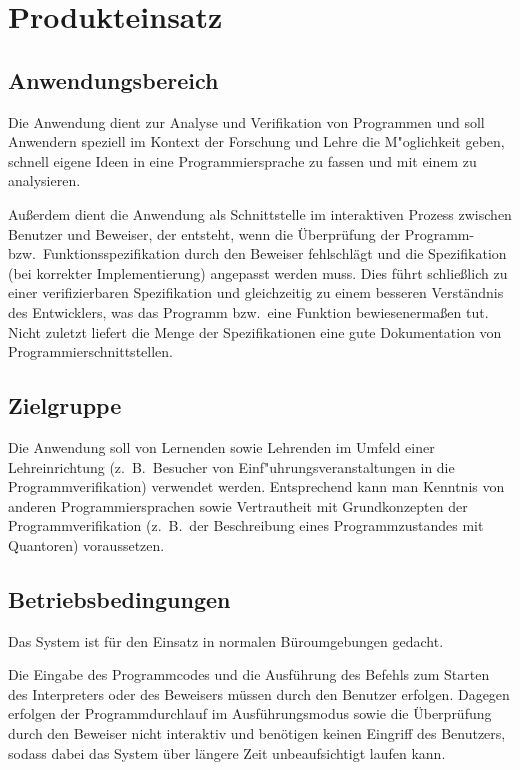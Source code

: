 \section{Produkteinsatz}%

\subsection{Anwendungsbereich}%

Die Anwendung dient zur Analyse und Verifikation von Programmen und soll Anwendern speziell im Kontext der Forschung und Lehre die M"oglichkeit geben, schnell eigene Ideen in eine Programmiersprache zu fassen und mit einem  zu analysieren.%

Außerdem dient die Anwendung als Schnittstelle im interaktiven Prozess zwischen Benutzer und Beweiser, der entsteht, wenn die Überprüfung der Programm- bzw.\ Funktionsspezifikation durch den Beweiser fehlschlägt und die Spezifikation (bei korrekter Implementierung) angepasst werden muss. Dies führt schließlich zu einer verifizierbaren Spezifikation und gleichzeitig zu einem besseren Verständnis des Entwicklers, was das Programm bzw.\ eine Funktion bewiesenermaßen tut. Nicht zuletzt liefert die Menge der Spezifikationen eine gute Dokumentation von Programmierschnittstellen.%

\subsection{Zielgruppe}%

Die Anwendung soll von Lernenden sowie Lehrenden im Umfeld einer Lehreinrichtung (z.~B.\ Besucher von Einf"uhrungsveranstaltungen in die Programmverifikation) verwendet werden. Entsprechend kann man Kenntnis von anderen Programmiersprachen sowie Vertrautheit mit Grundkonzepten der Programmverifikation (z.~B.\ der Beschreibung eines Programmzustandes mit Quantoren) voraussetzen.%

\subsection{Betriebsbedingungen}%

Das System ist für den Einsatz in normalen Büroumgebungen gedacht.

Die Eingabe des Programmcodes und die Ausführung des Befehls zum Starten des Interpreters oder des Beweisers müssen durch den Benutzer erfolgen. Dagegen erfolgen der Programmdurchlauf im Ausführungsmodus sowie die Überprüfung durch den Beweiser nicht interaktiv und benötigen keinen Eingriff des Benutzers, sodass dabei das System über längere Zeit unbeaufsichtigt laufen kann.
